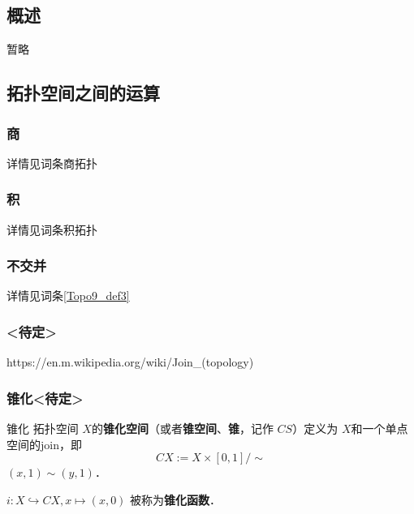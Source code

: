 
\begin{issues}
\issueDraft
\issueTODO
\issueMissDepend
\issueAbstract
\issueNeedCite
\end{issues}

\subsection{概述}

暂略

\subsection{拓扑空间之间的运算}

\subsubsection{商}

详情见词条商拓扑


\subsubsection{积}

详情见词条积拓扑


\subsubsection{不交并}

详情见词条\autoref{Topo9_def3}~


\subsubsection{<待定>}

https://en.m.wikipedia.org/wiki/Join_(topology)


\subsubsection{锥化<待定>}

\begin{definition}{锥化}
拓扑空间 $X$的\textbf{锥化空间}（或者\textbf{锥空间}、\textbf{锥}，记作 $C S$）定义为 $X$和一个单点空间的join，即
\[
    C X := X \times [0,1] / \sim
\]
$(x, 1) \sim (y, 1)$．

$i: X \hookrightarrow C X, x \mapsto (x, 0)$ 被称为\textbf{锥化函数}．
\end{definition}

